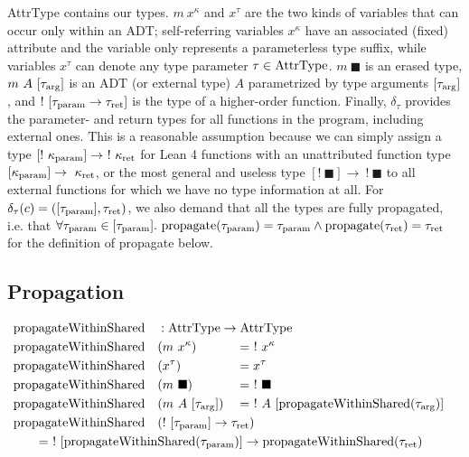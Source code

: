 AttrType contains our types. $m\ x^\kappa$ and $x^\tau$ are the two kinds of variables that can occur only within an ADT; self-referring variables $x^\kappa$ have an associated (fixed) attribute and the variable only represents a parameterless type suffix, while variables $x^\tau$ can denote any type parameter $\tau \in \mathrm{AttrType}$. $m\ \blacksquare$ is an erased type, $m\ A\ [\tau_{\mathrm{arg}}]$ is an ADT (or external type) $A$ parametrized by type arguments $[\tau_{\mathrm{arg}}]$, and $!\ [\tau_{\mathrm{param}} \to \tau_{\mathrm{ret}}]$ is the type of a higher-order function. Finally, $\delta_\tau$ provides the parameter- and return types for all functions in the program, including external ones. This is a reasonable assumption because we can simply assign a type $[!\ \kappa_\param] \to \ !\ \kappa_\ret$ for Lean 4 functions with an unattributed function type $[\kappa_{\mathrm{param}}] \to \ \kappa_{\mathrm{ret}}$, or the most general and useless type $[!\ \blacksquare] \to \ !\ \blacksquare$ to all external functions for which we have no type information at all. For $\delta_\tau(c) = ([\tau_{\mathrm{param}}], \tau_{\mathrm{ret}})$, we also demand that all the types are fully propagated, i.e. that $\forall \tau_{\mathrm{param}} \in [\tau_{\mathrm{param}}].\ \mathrm{propagate}(\tau_{\mathrm{param}}) = \tau_{\mathrm{param}} \land \mathrm{propagate}(\tau_{\mathrm{ret}}) = \tau_{\mathrm{ret}}$ for the definition of propagate below.

\subsection{Propagation}

\newcommand{\propagateWithinShared}{\mathrm{propagateWithinShared}}
\newcommand{\rebreak}[1]{\mathrlap{\qquad#1}}

\begin{alignat*}{3}
  &\propagateWithinShared &&: \mathrlap{\AttrType \to \AttrType} \\
  &\propagateWithinShared&&(m\ x^\kappa) &&=\ !\ x^\kappa \\
  &\propagateWithinShared&&(x^\tau) &&= x^\tau \\
  &\propagateWithinShared&&(m\ \blacksquare) &&=\ !\ \blacksquare \\
  &\propagateWithinShared&&(m\ A\ [\tau_\arrg]) &&=\ !\ A\ [\propagateWithinShared(\tau_\arrg)] \\
  &\propagateWithinShared&&\mathrlap{(!\ [\tau_\param] \to \tau_\ret)} \\
  &\rebreak{= \ !\ [\propagateWithinShared(\tau_\param)] \to \propagateWithinShared(\tau_\ret)}
\end{alignat*}

